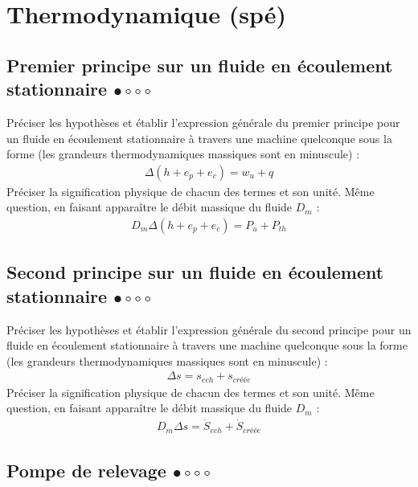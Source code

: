 \chapter{Thermodynamique (spé)}

\newpage

\section{Premier principe sur un fluide en écoulement stationnaire $\bullet\circ\circ\circ$}

Préciser les hypothèses et établir l'expression générale du premier principe pour un fluide en écoulement stationnaire à travers une machine quelconque sous la forme (les grandeurs thermodynamiques massiques sont en minuscule) :
\begin{align*}
	\Delta (h+e_p+e_c)=w_u+q
\end{align*}
Préciser la signification physique de chacun des termes et son unité.
Même question, en faisant apparaître le débit massique du fluide $D_m$ :
\begin{align*}
	D_m\Delta (h+e_p+e_c)=P_u+P_{th}
\end{align*}

\newpage

\section{Second principe sur un fluide en écoulement stationnaire $\bullet\circ\circ\circ$}

Préciser les hypothèses et établir l'expression générale du second principe pour un fluide en écoulement stationnaire à travers une machine quelconque sous la forme (les grandeurs thermodynamiques massiques sont en minuscule) :
\begin{align*}
	\Delta s=s_{ech}+s_{créée}
\end{align*}
Préciser la signification physique de chacun des termes et son unité.
Même question, en faisant apparaître le débit massique du fluide $D_m$ :
\begin{align*}
	D_m\Delta s=\dot{S}_{ech}+\dot{S}_{créée}
\end{align*}

\newpage

\section{Pompe de relevage $\bullet\circ\circ\circ$}

